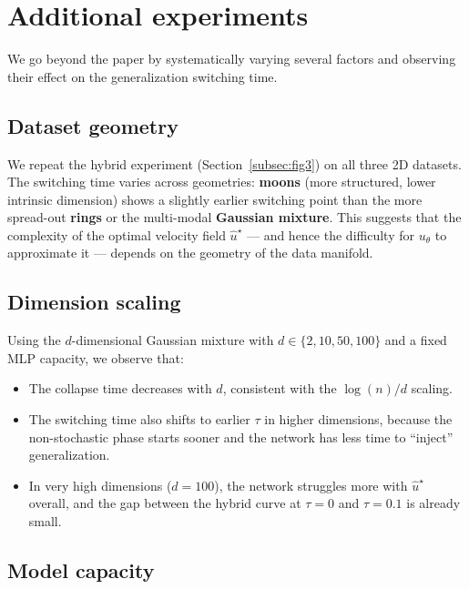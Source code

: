 \documentclass[10pt,a4paper]{article}
\theoremstyle{definition}
\begin{document}
\section{Additional experiments}\label{sec:additional}

We go beyond the paper by systematically varying several factors and observing their effect on the generalization switching time.

\subsection{Dataset geometry}

We repeat the hybrid experiment (Section~\ref{subsec:fig3}) on all three 2D datasets.
The switching time varies across geometries: \textbf{moons} (more structured, lower intrinsic dimension) shows a slightly earlier switching point than the more spread-out \textbf{rings} or the multi-modal \textbf{Gaussian mixture}.
This suggests that the complexity of the optimal velocity field $\hat{u}^\star$ --- and hence the difficulty for $u_\theta$ to approximate it --- depends on the geometry of the data manifold.

\subsection{Dimension scaling}

Using the $d$-dimensional Gaussian mixture with $d \in \{2, 10, 50, 100\}$ and a fixed MLP capacity, we observe that:
\begin{itemize}[nosep,leftmargin=1.5em]
    \item The collapse time decreases with $d$, consistent with the $\log(n)/d$ scaling.
    \item The switching time also shifts to earlier $\tau$ in higher dimensions, because the non-stochastic phase starts sooner and the network has less time to ``inject'' generalization.
    \item In very high dimensions ($d = 100$), the network struggles more with $\hat{u}^\star$ overall, and the gap between the hybrid curve at $\tau = 0$ and $\tau = 0.1$ is already small.
\end{itemize}

\subsection{Model capacity}
\end{document}
